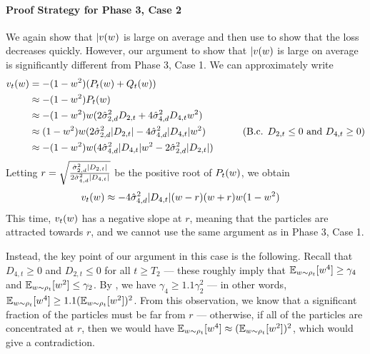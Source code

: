 \paragraph{Proof Strategy for Phase 3, Case 2} We again show that $|v(w)$ is large on average and then use  to show that the loss decreases quickly. However, our argument to show that $|v(w)$ is large on average is significantly different from Phase 3, Case 1. We can approximately write
\begin{align}
v_t(\w)
& = -(1 - \w^2) (P_t(\w) + Q_t(\w)) \\
& \approx -(1 - \w^2) P_t(\w) \\
& \approx -(1 - \w^2) \w (2 \sigmaCoeffTwo^2 D_{2, t} + 4 \sigmaCoeffFour^2 D_{4, t} \w^2) \\
& \approx (1 - \w^2) \w (2 \sigmaCoeffTwo^2 |D_{2, t}| - 4 \sigmaCoeffFour^2 |D_{4, t}| \w^2) 
& \tag{B.c. $D_{2, t} \leq 0$ and $D_{4, t} \geq 0$} \\
& \approx -(1 - \w^2) \w (4 \sigmaCoeffFour^2 |D_{4, t}| \w^2 - 2 \sigmaCoeffTwo^2 |D_{2, t}|)
\end{align}
Letting $r = \sqrt{\frac{\hat{\sigma}_{2, d}^2 |D_{2, t}|}{2 \hat{\sigma}_{4, d}^2 |D_{4, t}|}}$ be the positive root of $P_t(w)$, we obtain
\begin{align}
v_t(w)
& \approx - 4 \hat{\sigma}_{4, d}^2 |D_{4, t}| (w - r)(w + r) w (1 - w^2)
\end{align}
This time, $v_t(w)$ has a negative slope at $r$, meaning that the particles are attracted towards $r$, and we cannot use the same argument as in Phase 3, Case 1. 

Instead, the key point of our argument in this case is the following. Recall that $D_{4, t} \geq 0$ and $D_{2, t} \leq 0$ for all $t \geq T_2$ --- these roughly imply that $\operatorname*{\mathbb{E}}_{w \sim \rho_t} [w^4] \geq \gamma_4$ and $\operatorname*{\mathbb{E}}_{w \sim \rho_t} [w^2] \leq \gamma_2$. By , we have $\gamma_4 \geq 1.1 \gamma_2^2$ --- in other words, $\operatorname*{\mathbb{E}}_{w \sim \rho_t}[w^4] \geq 1.1 (\operatorname*{\mathbb{E}}_{w \sim \rho_t}[w^2])^2$. From this observation, we know that a significant fraction of the particles must be far from $r$ --- otherwise, if all of the particles are concentrated at $r$, then we would have $\operatorname*{\mathbb{E}}_{w \sim \rho_t} [w^4] \approx (\operatorname*{\mathbb{E}}_{w \sim \rho_t}[w^2])^2$, which would give a contradiction.

